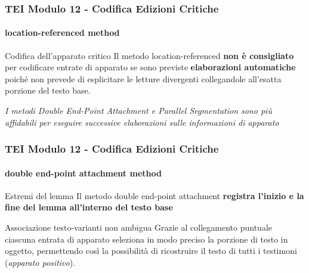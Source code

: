\begin{frame}
    \frametitle{TEI Modulo 12 - Codifica Edizioni Critiche}
    \framesubtitle{location-referenced method}
    \addtocounter{nframe}{1}
    


    \begin{block}{Codifica dell'apparato critico}
       Il metodo location-referenced \textbf{non è consigliato} per codificare entrate di apparato se sono previste \textbf{elaborazioni automatiche} poiché non prevede di esplicitare le letture divergenti collegandole all'esatta porzione del testo base.
    \end{block}

    \begin{center}
        \textit{I metodi Double End-Point Attachment e Parallel Segmentation sono più affidabili per eseguire successive elaborazioni sulle informazioni di apparato}
    \end{center}
    
\end{frame}



\begin{frame}
    \frametitle{TEI Modulo 12 - Codifica Edizioni Critiche}
    \framesubtitle{double end-point attachment method}
    \addtocounter{nframe}{1}
    



    \begin{block}{Estremi del lemma}
      Il metodo double end-point attachment \textbf{registra l'inizio e la fine del lemma all'interno del testo base}
    \end{block}
    
    \begin{block}{Associazione testo-varianti non ambigua}
        Grazie al collegamento puntuale ciascuna entrata di apparato seleziona in modo preciso la porzione di testo in oggetto, permettendo così la possibilità di ricostruire il testo di tutti i testimoni (\textit{apparato positivo}).
    \end{block}

\end{frame}





